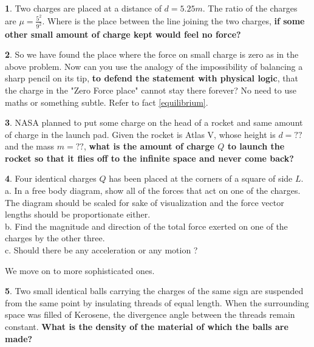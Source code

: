 \documentclass[11pt,a4paper,twocolumn,openright]{article}
\theoremstyle{definition}
\theoremstyle{definition}
\newtheorem{pr}{ \framebox[0.05\textwidth]{{\sffamily Pr}} }
\theoremstyle{definition}
\theoremstyle{definition}
\begin{document}
\begin{pr}

Two charges are placed at a distance of $d = 5.25 m$. The ratio of the charges are $ \mu = \frac{5^2}{9^2} $. Where is the place between the line joining the two charges, \textbf{if some other small amount of charge kept would feel no force?}



\end{pr}

\begin{pr}

So we have found the place where the force on small charge is zero as in the above problem. Now can you use the analogy of the impossibility of balancing a sharp pencil on its tip, \textbf{to defend the statement with physical logic}, that the charge in the "Zero Force place" cannot stay there forever? No need to use maths or something subtle. Refer to fact \ref{equilibrium}.

\end{pr}

\begin{pr}
NASA planned to put some charge on the head of a rocket and same amount of charge in the launch pad. Given the rocket is Atlas V, whose  height is $d = ??$ and the mass $m = ??$, \textbf{what is the amount of charge $Q$ to launch the rocket so that it flies off to the infinite space and never come back?}
\end{pr}

\begin{pr}
Four identical charges $Q$ has been placed at the corners of a square of side $L$. \\
a. In a free body diagram, show all of the forces that act on one of the charges. The diagram should be scaled for sake of visualization and the force vector lengths should be proportionate either. \\
b. Find the magnitude and direction of the total force exerted on one of the charges by the other three.\\
c. Should there be any acceleration or any motion ?
\end{pr}



We move on to more sophisticated ones.


\begin{pr}
Two small identical balls carrying the charges of the same sign are suspended from the same point by insulating threads of equal length. When the surrounding space was filled of Kerosene, the divergence angle between the threads remain constant. \textbf{What is the density of the material of which the balls are made?}
\end{pr}
\end{document}
